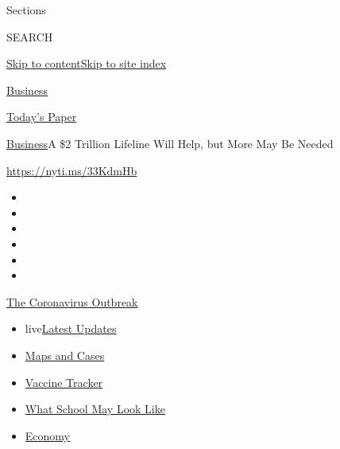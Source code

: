 Sections

SEARCH

\protect\hyperlink{site-content}{Skip to
content}\protect\hyperlink{site-index}{Skip to site index}

\href{https://www.nytimes.com/section/business}{Business}

\href{https://myaccount.nytimes.com/auth/login?response_type=cookie\&client_id=vi}{}

\href{https://www.nytimes.com/section/todayspaper}{Today's Paper}

\href{/section/business}{Business}\textbar{}A \$2 Trillion Lifeline Will
Help, but More May Be Needed

\url{https://nyti.ms/33KdmHb}

\begin{itemize}
\item
\item
\item
\item
\item
\item
\end{itemize}

\href{https://www.nytimes.com/news-event/coronavirus?action=click\&pgtype=Article\&state=default\&region=TOP_BANNER\&context=storylines_menu}{The
Coronavirus Outbreak}

\begin{itemize}
\tightlist
\item
  live\href{https://www.nytimes.com/2020/08/01/world/coronavirus-covid-19.html?action=click\&pgtype=Article\&state=default\&region=TOP_BANNER\&context=storylines_menu}{Latest
  Updates}
\item
  \href{https://www.nytimes.com/interactive/2020/us/coronavirus-us-cases.html?action=click\&pgtype=Article\&state=default\&region=TOP_BANNER\&context=storylines_menu}{Maps
  and Cases}
\item
  \href{https://www.nytimes.com/interactive/2020/science/coronavirus-vaccine-tracker.html?action=click\&pgtype=Article\&state=default\&region=TOP_BANNER\&context=storylines_menu}{Vaccine
  Tracker}
\item
  \href{https://www.nytimes.com/interactive/2020/07/29/us/schools-reopening-coronavirus.html?action=click\&pgtype=Article\&state=default\&region=TOP_BANNER\&context=storylines_menu}{What
  School May Look Like}
\item
  \href{https://www.nytimes.com/live/2020/07/31/business/stock-market-today-coronavirus?action=click\&pgtype=Article\&state=default\&region=TOP_BANNER\&context=storylines_menu}{Economy}
\end{itemize}

